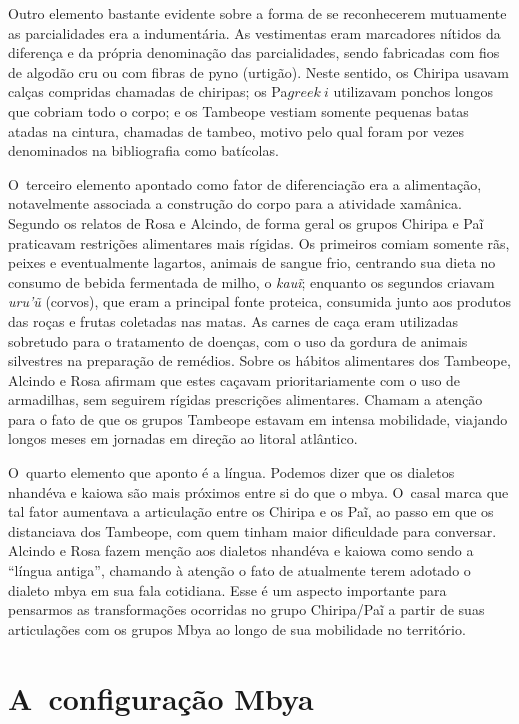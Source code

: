 Outro elemento bastante evidente sobre a forma de se reconhecerem
mutuamente as parcialidades era a indumentária. As vestimentas eram
marcadores nítidos da diferença e da própria denominação das
parcialidades, sendo fabricadas com fios de algodão cru ou com fibras
de pyno (urtigão). Neste sentido, os Chiripa usavam calças compridas
chamadas de chiripas; os Pa${greek{~i}}$ utilizavam ponchos
longos que cobriam todo o corpo; e os Tambeope vestiam somente pequenas
batas atadas na cintura, chamadas de tambeo, motivo pelo qual foram por
vezes denominados na bibliografia como batícolas.

O~terceiro elemento apontado como fator de diferenciação era a alimentação, notavelmente associada a
construção do corpo para a atividade xamânica. Segundo os relatos de
Rosa e Alcindo, de forma geral os grupos Chiripa e
Paĩ praticavam restrições alimentares mais
rígidas. Os primeiros comiam somente rãs, peixes e eventualmente
lagartos, animais de sangue frio, centrando sua dieta no consumo de
bebida fermentada de milho, o \emph{kauĩ}; enquanto os
segundos criavam \emph{uru’ũ} (corvos), que eram a principal fonte proteica,
consumida junto aos produtos das roças e frutas coletadas nas matas. As
carnes de caça eram utilizadas sobretudo para o tratamento de doenças,
com o uso da gordura de animais silvestres na preparação de remédios.
Sobre os hábitos alimentares dos Tambeope, Alcindo e Rosa afirmam que
estes caçavam prioritariamente com o uso de armadilhas, sem seguirem
rígidas prescrições alimentares. Chamam a atenção para o fato de que os
grupos Tambeope estavam em intensa mobilidade, viajando longos meses em
jornadas em direção ao litoral atlântico. 

O~quarto elemento que aponto é a língua.
Podemos dizer que os dialetos nhandéva e kaiowa são mais próximos entre
si do que o mbya. O~casal marca que
tal fator aumentava a articulação entre os Chiripa e os
Paĩ, ao passo em que os distanciava dos Tambeope,
com quem tinham maior dificuldade para conversar. Alcindo e Rosa fazem
menção aos dialetos nhandéva e kaiowa como sendo a ``língua antiga'',
chamando à atenção o fato de atualmente terem adotado o dialeto mbya em
sua fala cotidiana. Esse é um aspecto importante para pensarmos as
transformações ocorridas no grupo Chiripa/Paĩ a
partir de suas articulações com os grupos Mbya ao longo de sua
mobilidade no território.

\section{A~configuração Mbya}

